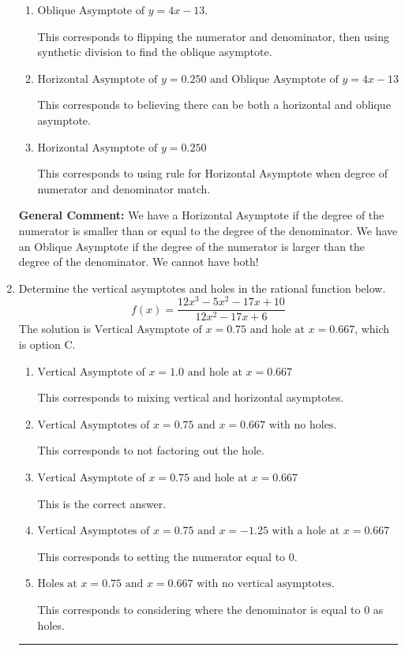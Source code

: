 \documentclass{extbook}[14pt]
\newcommand{\litem}[1]{\item #1

\rule{\textwidth}{0.4pt}}
\begin{document}
\begin{enumerate}
{\begin{enumerate}[label=\Alph*.]
* This is the correct option.
\item \( \text{Oblique Asymptote of } y = 4x -13. \)

This corresponds to flipping the numerator and denominator, then using synthetic division to find the oblique asymptote.
\item \( \text{Horizontal Asymptote of } y = 0.250 \text{ and Oblique Asymptote of } y = 4x -13 \)

This corresponds to believing there can be both a horizontal and oblique asymptote.
\item \( \text{Horizontal Asymptote of } y = 0.250  \)

This corresponds to using rule for Horizontal Asymptote when degree of numerator and denominator match.
\end{enumerate}

\textbf{General Comment:} We have a Horizontal Asymptote if the degree of the numerator is smaller than or equal to the degree of the denominator. We have an Oblique Asymptote if the degree of the numerator is larger than the degree of the denominator. We cannot have both!
}
\litem{
Determine the vertical asymptotes and holes in the rational function below.
\[ f(x) = \frac{12x^{3} -5 x^{2} -17 x + 10}{12x^{2} -17 x + 6} \]The solution is \( \text{Vertical Asymptote of } x = 0.75 \text{ and hole at } x = 0.667 \), which is option C.\begin{enumerate}[label=\Alph*.]
\item \( \text{Vertical Asymptote of } x = 1.0 \text{ and hole at } x = 0.667 \)

This corresponds to mixing vertical and horizontal asymptotes.
\item \( \text{Vertical Asymptotes of } x = 0.75 \text{ and } x = 0.667 \text{ with no holes.} \)

This corresponds to not factoring out the hole.
\item \( \text{Vertical Asymptote of } x = 0.75 \text{ and hole at } x = 0.667 \)

This is the correct answer.
\item \( \text{Vertical Asymptotes of } x = 0.75 \text{ and } x = -1.25 \text{ with a hole at } x = 0.667 \)

This corresponds to setting the numerator equal to 0.
\item \( \text{Holes at } x = 0.75 \text{ and } x = 0.667 \text{ with no vertical asymptotes.} \)

This corresponds to considering where the denominator is equal to 0 as holes.
\end{enumerate}

}
\end{enumerate}
\end{document}
